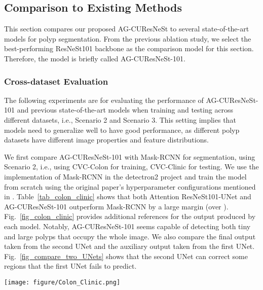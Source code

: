 \documentclass[review, sort&compress]{elsarticle}
\begin{document}
	\subsection{Comparison to Existing Methods}
	This section compares our proposed AG-CUResNeSt to several state-of-the-art models for polyp segmentation. From the previous ablation study, we select the best-performing ResNeSt101 backbone as the comparison model for this section. Therefore, the model is briefly called AG-CUResNeSt-101.
	
	\subsubsection{Cross-dataset Evaluation}
	The following experiments are for evaluating the performance of AG-CUResNeSt-101 and previous state-of-the-art models when training and testing across different datasets, i.e., Scenario 2 and Scenario 3. This setting implies that models need to generalize well to have good performance, as different polyp datasets have different image properties and feature distributions.
	
	We first compare AG-CUResNeSt-101 with Mask-RCNN \cite{qadir2019polyp} for segmentation, using Scenario 2, i.e., using CVC-Colon for training, CVC-Clinic for testing. We use the implementation of Mask-RCNN in the detectron2 project and train the model from scratch using the original paper's hyperparameter configurations mentioned in \cite{qadir2019polyp}. Table~\ref{tab_colon_clinic} shows that both Attention ResNeSt101-UNet and AG-CUResNeSt-101 outperform Mask-RCNN by a large margin (over ). Fig.~\ref{fig_colon_clinic} provides additional references for the output produced by each model. Notably, AG-CUResNeSt-101 seems capable of detecting both tiny and large polyps that occupy the whole image. We also compare the final output taken from the second UNet and the auxiliary output taken from the first UNet. Fig.~\ref{fig_compare_two_UNets} shows that the second UNet can correct some regions that the first UNet fails to predict.
	


	\begin{figure*}[ht!]
		\centering
		\texttt{[image: figure/Colon\_Clinic.png]}
		\caption{Qualitative result comparison using Colon for training and Clinic for testing. From left to righ: input image, ground truth, visualization of ResNet101-MaskR-CNN's output in overlay mode, binary output of ResNet101-MaskR-CNN, visualization of ResNet50-MaskR-CNN's output in overlay mode, binary output of ResNet50-MaskR-CNN, binary output of AG-CUResNeSt-101, and attention map in the last attention gate denote by  in Fig.~\ref{fig:fig_attention_ResCUNeSt}. The red color in the attention map indicates the region where the model focus on.}
		\label{fig_colon_clinic}
	\end{figure*}
	
\end{document}
